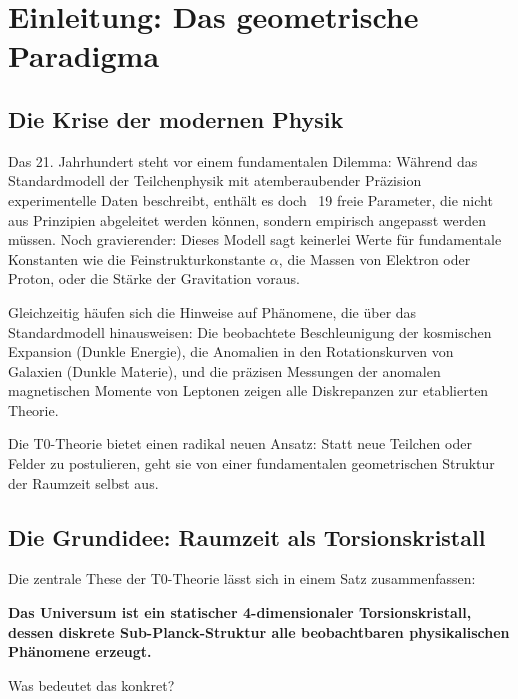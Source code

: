 	
	
	
	\section{Einleitung: Das geometrische Paradigma}
	
	\subsection{Die Krise der modernen Physik}
	
	Das 21. Jahrhundert steht vor einem fundamentalen Dilemma: Während das Standardmodell der Teilchenphysik mit atemberaubender Präzision experimentelle Daten beschreibt, enthält es doch ~19 freie Parameter, die nicht aus Prinzipien abgeleitet werden können, sondern empirisch angepasst werden müssen. Noch gravierender: Dieses Modell sagt keinerlei Werte für fundamentale Konstanten wie die Feinstrukturkonstante \(\alpha\), die Massen von Elektron oder Proton, oder die Stärke der Gravitation voraus.
	
	Gleichzeitig häufen sich die Hinweise auf Phänomene, die über das Standardmodell hinausweisen: Die beobachtete Beschleunigung der kosmischen Expansion (Dunkle Energie), die Anomalien in den Rotationskurven von Galaxien (Dunkle Materie), und die präzisen Messungen der anomalen magnetischen Momente von Leptonen zeigen alle Diskrepanzen zur etablierten Theorie.
	
	Die T0-Theorie bietet einen radikal neuen Ansatz: Statt neue Teilchen oder Felder zu postulieren, geht sie von einer fundamentalen geometrischen Struktur der Raumzeit selbst aus.
	
	\subsection{Die Grundidee: Raumzeit als Torsionskristall}
	
	Die zentrale These der T0-Theorie lässt sich in einem Satz zusammenfassen:
	
	\begin{center}
		\textbf{Das Universum ist ein statischer 4-dimensionaler Torsionskristall, dessen diskrete Sub-Planck-Struktur alle beobachtbaren physikalischen Phänomene erzeugt.}
	\end{center}
	
	Was bedeutet das konkret?
	
